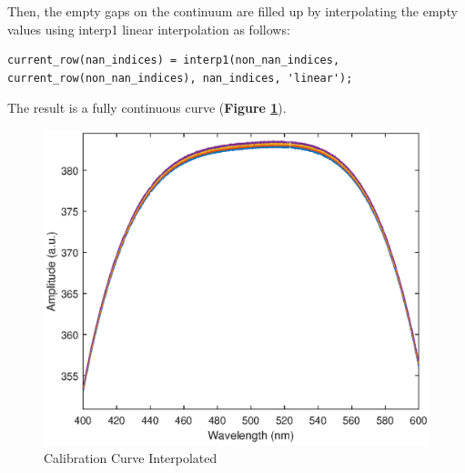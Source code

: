 Then, the empty gaps on the continuum are filled up by interpolating the empty values using interp1 linear interpolation as follows:
\begin{lstlisting}
current_row(nan_indices) = interp1(non_nan_indices, current_row(non_nan_indices), nan_indices, 'linear');
\end{lstlisting}
The result is a fully continuous curve (\textbf{Figure \ref{fig:Figure 7}}).
\begin{figure}[H]
    \centering
    \includegraphics[width = 1\textwidth ]{figures/interpol_calibrationCurve.eps}
    \caption{Calibration Curve Interpolated }
    \label{fig:Figure 7}
\end{figure}

